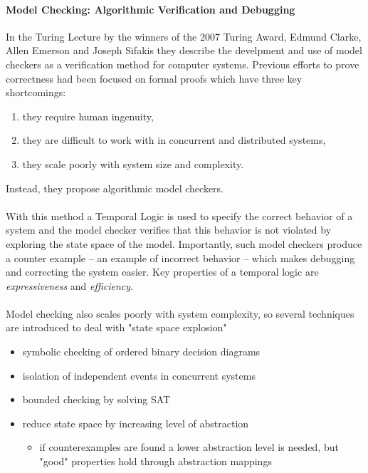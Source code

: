 \documentclass{uit-thesis}
\begin{document}
\paragraph{Model Checking: Algorithmic Verification and Debugging~\cite{Clarke2009}}
In the Turing Lecture by the winners of the 2007 Turing Award, Edmund Clarke, Allen Emerson and Joseph Sifakis they describe the develpment and use of model checkers as a verification method for computer systems. Previous efforts to prove correctness had been focused on formal proofs which have three key shortcomings:
\begin{enumerate}
    \item they require human ingenuity,
    \item they are difficult to work with in concurrent and distributed systems,
    \item they scale poorly with system size and complexity.
\end{enumerate}
Instead, they propose algorithmic model checkers.
\\\\
With this method a Temporal Logic is used to specify the correct behavior of a system and the model checker verifies that this behavior is not violated by exploring the state space of the model. Importantly, such model checkers produce a counter example -- an example of incorrect behavior -- which makes debugging and correcting the system easier.
Key properties of a temporal logic are \textit{expressiveness} and \textit{efficiency}.
\\\\
Model checking also scales poorly with system complexity, so several techniques are introduced to deal with "state space explosion"
\begin{itemize}
    \item symbolic checking of ordered binary decision diagrams
    \item isolation of independent events in concurrent systems
    \item bounded checking by solving SAT
    \item reduce state space by increasing level of abstraction
    \begin{itemize}
        \item if counterexamples are found a lower abstraction level is needed, but "good" properties hold through abstraction mappings
    \end{itemize}
\end{itemize}
\end{document}
